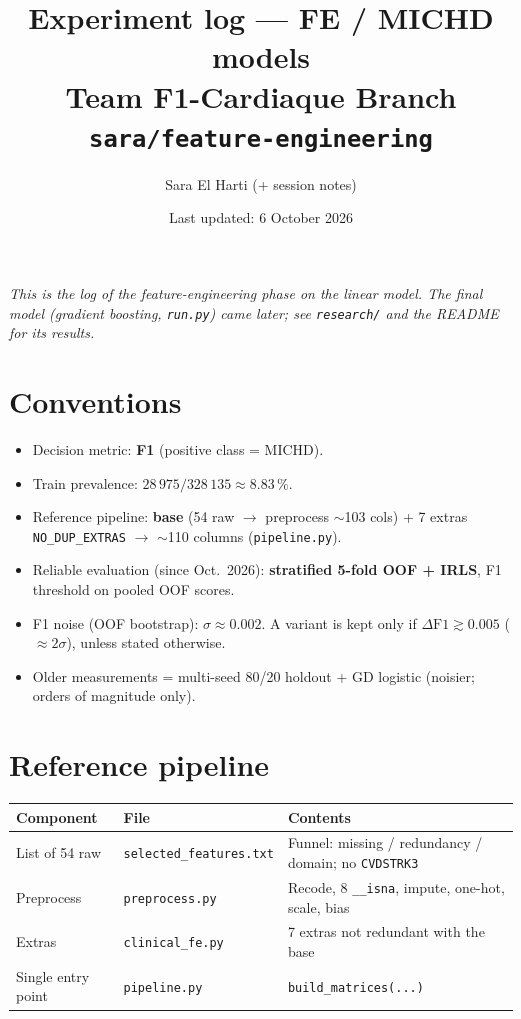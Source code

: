 \documentclass[11pt,a4paper]{article}
\title{Experiment log --- FE / MICHD models\\
\large Team F1-Cardiaque \textperiodcentered{} Branch \texttt{sara/feature-engineering}}
\author{Sara El Harti (+ session notes)}
\date{Last updated: 6 October 2026}
\begin{document}
\maketitle

\noindent\textit{This is the log of the feature-engineering phase on the linear model.
The final model (gradient boosting, \texttt{run.py}) came later; see \texttt{research/}
and the README for its results.}

\section{Conventions}
\begin{itemize}
  \item Decision metric: \textbf{F1} (positive class = MICHD).
  \item Train prevalence: $28\,975 / 328\,135 \approx 8.83\,\%$.
  \item Reference pipeline: \textbf{base} (54 raw $\to$ preprocess $\sim$103 cols)
        + 7 extras \texttt{NO\_DUP\_EXTRAS} $\to$ $\sim$110 columns
        (\texttt{pipeline.py}).
  \item Reliable evaluation (since Oct.\ 2026): \textbf{stratified 5-fold OOF + IRLS},
        F1 threshold on pooled OOF scores.
  \item F1 noise (OOF bootstrap): $\sigma \approx 0.002$.
        A variant is kept only if $\Delta\mathrm{F1} \gtrsim 0.005$
        ($\approx 2\sigma$), unless stated otherwise.
  \item Older measurements = multi-seed 80/20 holdout + GD logistic (noisier;
        orders of magnitude only).
\end{itemize}

\section{Reference pipeline}
\begin{tabular}{@{}llp{7.2cm}@{}}
\toprule
Component & File & Contents \\
\midrule
List of 54 raw & \texttt{selected\_features.txt} & Funnel: missing / redundancy / domain; no \texttt{CVDSTRK3} \\
Preprocess & \texttt{preprocess.py} & Recode, 8 \texttt{\_\_isna}, impute, one-hot, scale, bias \\
Extras & \texttt{clinical\_fe.py} & 7 extras not redundant with the base \\
Single entry point & \texttt{pipeline.py} & \texttt{build\_matrices(...)} \\
\bottomrule
\end{tabular}
\end{document}

